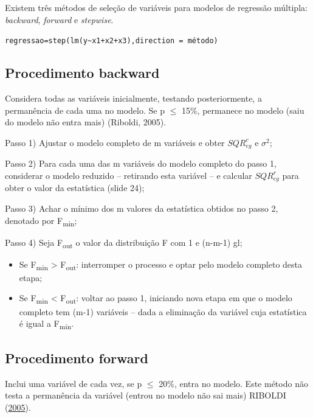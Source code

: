 \documentclass[12pt,brazil,oneside]{book}
\begin{document}
Existem três métodos de seleção de variáveis para modelos de regressão
múltipla: \emph{backward}, \emph{forward} e \emph{stepwise}.

\texttt{regressao=step(lm(y\textasciitilde{}x1+x2+x3),direction\ =\ \textquotesingle{}método\textquotesingle{})}

\hypertarget{procedimento-backward}{%
\subsection{Procedimento backward}\label{procedimento-backward}}

Considera todas as variáveis inicialmente, testando posteriormente, a
permanência de cada uma no modelo. Se p \(\leq\) 15\%, permanece no
modelo (saiu do modelo não entra mais) (Riboldi, 2005).

Passo 1) Ajustar o modelo completo de m variáveis e obter
\(SQR^{c}_{eg}\) e \(\sigma^{2}\);

Passo 2) Para cada uma das m variáveis do modelo completo do passo 1,
considerar o modelo reduzido -- retirando esta variável -- e calcular
\(SQR^{r}_{eg}\) para obter o valor da estatística (slide 24);

Passo 3) Achar o mínimo dos m valores da estatística obtidos no passo 2,
denotado por F\textsubscript{min};

Passo 4) Seja F\textsubscript{out} o valor da distribuição F com 1 e
(n-m-1) gl;

\begin{itemize}
\item
  Se F\textsubscript{min} \textgreater{} F\textsubscript{out}:
  interromper o processo e optar pelo modelo completo desta etapa;
\item
  Se F\textsubscript{min} \textless{} F\textsubscript{out}: voltar ao
  passo 1, iniciando nova etapa em que o modelo completo tem (m-1)
  variáveis -- dada a eliminação da variável cuja estatística é igual a
  F\textsubscript{min}.
\end{itemize}

\hypertarget{procedimento-forward}{%
\subsection{Procedimento forward}\label{procedimento-forward}}

Inclui uma variável de cada vez, se p \(\leq\) 20\%, entra no modelo.
Este método não testa a permanência da variável (entrou no modelo não
sai mais) RIBOLDI (\protect\hyperlink{ref-Riboldi2005}{2005}).
\end{document}
